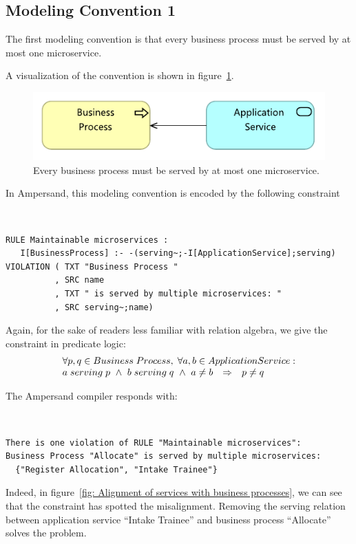 \documentclass[sn-vancouver]{sn-jnl}%
\theoremstyle{thmstyleone}%
\theoremstyle{thmstyletwo}%
\theoremstyle{thmstylethree}%
\begin{document}
\subsection{Modeling Convention 1}
The first modeling convention is that every business process must be served by at most one microservice.

A visualization of the convention is shown in figure~\ref{MC1}.

\begin{figure}[b]
\centering
\includegraphics[clip=true, scale=0.7]{MC1}
\caption{\small{Every business process must be served by at most one microservice.}}
\label{MC1}
\end{figure}

In Ampersand, this modeling convention is encoded by the following constraint
{\tt\small
\begin{lstlisting}[frame=single, label={mc1}, caption={}]
RULE Maintainable microservices :
   I[BusinessProcess] :- -(serving~;-I[ApplicationService];serving)
VIOLATION ( TXT "Business Process "
          , SRC name
          , TXT " is served by multiple microservices: "
          , SRC serving~;name)
\end{lstlisting}
}
Again, for the sake of readers less familiar with relation algebra, we give the constraint in predicate logic:
\[\begin{array}{rcl}
   \multicolumn{3}{l}{\forall p,q \in Business\;Process, \;\forall a,b\in Application Service:}\\
   a \;serving \;p\ \wedge\ b \;serving \;q\ \wedge\ a\not =b&\Rightarrow&p\not =q
\end{array}\]

The Ampersand compiler responds with:

{\tt\small
\begin{lstlisting}[frame=single, label={mc1result}, caption={}]
There is one violation of RULE "Maintainable microservices":
Business Process "Allocate" is served by multiple microservices:
  {"Register Allocation", "Intake Trainee"}
\end{lstlisting}
}

Indeed, in figure~\ref{fig: Alignment of services with business processes},
we can see that the constraint has spotted the misalignment.
Removing the serving relation between application service ``Intake Trainee'' and business process ``Allocate'' solves the problem.
\end{document}
